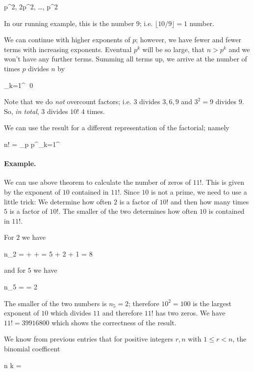 \bee
p^2, 2p^2, \ldots, \left\lfloor {} \right\rfloor p^2
\eee

In our running example, this is the number $9$; i.e. $\lfloor 10 / 9 \rfloor = 1$ number.

We can continue with higher exponents of $p$; however, we have fewer and fewer terms with increasing exponents. Eventual $p^k$ will be so large, that $n > p^k$ and we won't have any further terms. Summing all terms up, we arrive at the number of times $p$ divides $n$ by

\bee
\sum_{k=1}^\infty \left\lfloor {} \right\rfloor \qed
\eee

Note that we do \emph{not} overcount factors; i.e. $3$ divides $3, 6, 9$ and $3^2 = 9$ divides $9$. So, \emph{in total}, $3$ divides $10!$ $4$ times.

We can use the result for a different representation of the factorial; namely

\bee
n! = \prod_p p^{\sum_{k=1}^\infty \left\lfloor {} \right\rfloor}
\eee

\paragraph{Example.} We can use above theorem to calculate the number of zeros of $11!$. This is given by the exponent of $10$ contained in $11!$. Since $10$ is not a prime, we need to use a little trick: We determine how often $2$ is a factor of $10!$ and then how many times $5$ is a factor of $10!$. The smaller of the two determines how often $10$ is contained in $11!$.

For $2$ we have

\bee
n_2 = \left\lfloor {} \right\rfloor + \left\lfloor {} \right\rfloor + \left\lfloor {} \right\rfloor = 5 + 2 + 1 = 8
\eee

and for $5$ we have

\bee
n_5 = \left\lfloor {} \right\rfloor = 2
\eee

The smaller of the two numbers is $n_5 = 2$; therefore $10^2 = 100$ is the largest exponent of $10$ which divides $11$ and therefore $11!$ has two zeros. We have $11! = 39916800$ which shows the correctness of the result.

We know from previous entries that for positive integers $r,n$ with $1 \leq r < n$, the binomial coefficent

\bee
{n \choose k} = 
\eee

